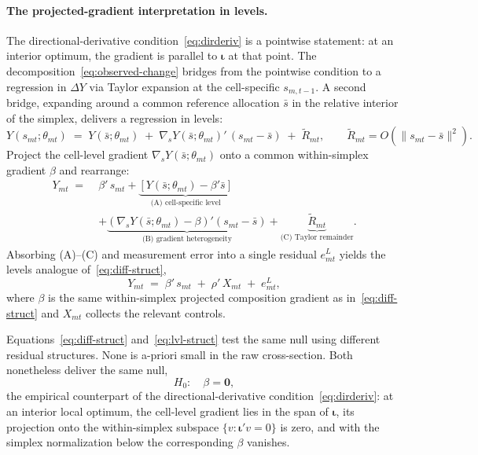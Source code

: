 \documentclass{article}
\newcommand{\bzero}{\mathbf{0}}
\newcommand{\iotaVec}{\boldsymbol{\iota}}
\theoremstyle{plain}
\theoremstyle{definition}
\theoremstyle{remark}
\begin{document}
\paragraph{The projected-gradient interpretation in levels.}
The directional-derivative condition~\eqref{eq:dirderiv} is a pointwise
statement: at an interior optimum, the gradient is parallel to $\iotaVec$ at
that point. The decomposition~\eqref{eq:observed-change} bridges from the
pointwise condition to a regression in $\Delta Y$ via Taylor expansion at the
cell-specific $s_{m,t-1}$. A second bridge, expanding around a common
reference allocation $\bar s$ in the relative interior of the simplex,
delivers a regression in levels:
\begin{equation}\label{eq:taylor-lvl}
  Y(s_{mt};\theta_{mt})
  \;=\;
  Y(\bar s;\theta_{mt})
  \;+\;
  \nabla_{s} Y(\bar s;\theta_{mt})'\,(s_{mt}-\bar s)
  \;+\; \tilde R_{mt},
  \qquad
  \tilde R_{mt}=O(\|s_{mt}-\bar s\|^{2}).
\end{equation}
Project the cell-level gradient $\nabla_{s} Y(\bar s;\theta_{mt})$ onto a
common within-simplex gradient $\beta$ and rearrange:
\begin{equation}\label{eq:lvl-decomp}
\begin{split}
  Y_{mt}
  \;=\;
  & \beta'\,s_{mt}
  +\underbrace{[Y(\bar s;\theta_{mt})-\beta'\bar s]}_{\text{(A) cell-specific level}} \\
  & +\underbrace{(\nabla_{s} Y(\bar s;\theta_{mt})-\beta)'(s_{mt}-\bar s)}_{\text{(B) gradient heterogeneity}}
  +\underbrace{\tilde R_{mt}}_{\text{(C) Taylor remainder}}.
\end{split}
\end{equation}
Absorbing (A)--(C) and measurement error into a single residual $e^{L}_{mt}$
yields the levels analogue of~\eqref{eq:diff-struct},
\begin{equation}\label{eq:lvl-struct}
  Y_{mt}
  \;=\;
  \beta'\,s_{mt}
  \;+\; \rho'\,X_{mt}
  \;+\; e^{L}_{mt},
\end{equation}
where $\beta$ is the same within-simplex projected composition gradient as
in~\eqref{eq:diff-struct} and $X_{mt}$ collects the relevant controls.

Equations~\eqref{eq:diff-struct} and~\eqref{eq:lvl-struct} test the same null using different residual structures. None is a-priori
small in the raw cross-section. Both nonetheless deliver the same null,
\begin{equation}\label{eq:H0}
  H_{0}:\quad \beta = \bzero,
\end{equation}
the empirical counterpart of the directional-derivative
condition~\eqref{eq:dirderiv}: at an interior local optimum, the cell-level
gradient lies in the span of $\iotaVec$, its projection onto the
within-simplex subspace $\{v:\iotaVec' v=0\}$ is zero, and with the simplex
normalization below the corresponding $\beta$ vanishes.
\end{document}
